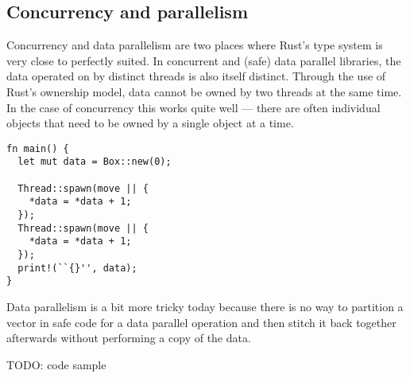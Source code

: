 \subsection{Concurrency and parallelism}

Concurrency and data parallelism are two places where Rust's type system is very close to perfectly suited.
In concurrent and (safe) data parallel libraries, the data operated on by distinct threads is also itself distinct.
Through the use of Rust's ownership model, data cannot be owned by two threads at the same time.
In the case of concurrency this works quite well --- there are often individual objects that need to be owned by
a single object at a time.

\begin{lstlisting}
fn main() {
  let mut data = Box::new(0);

  Thread::spawn(move || {
    *data = *data + 1;
  });
  Thread::spawn(move || {
    *data = *data + 1;
  });
  print!(``{}'', data);
}
\end{lstlisting}


Data parallelism is a bit more tricky today because there is no way to \eg{} partition a vector in safe code
for a data parallel operation and then stitch it back together afterwards without performing a copy of the data.

TODO: code sample


